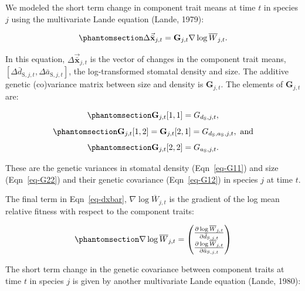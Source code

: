 \documentclass[
  letterpaper,
  DIV=11,
  numbers=noendperiod]{scrartcl}
\begin{document}
We modeled the short term change in component trait means at time \(t\)
in species \(j\) using the multivariate Lande equation (Lande, 1979):

\begin{equation}\phantomsection\label{eq-dxbar}{\Delta \vec{\bar{\mathbf{x}}}_{j,t} = \mathbf{G}_{j,t} \nabla \log \overline{W}_{j,t}.}\end{equation}

In this equation, \(\Delta \vec{\bar{\mathbf{x}}}_{j,t}\) is the vector
of changes in the component trait means,
\(\left[\Delta \bar{d}_{\mathrm{S},j,t}, \Delta \bar{a}_{\mathrm{S},j,t}\right]\),
the log-transformed stomatal density and size. The additive genetic
(co)variance matrix between size and density is \(\mathbf{G}_{j,t}\).
The elements of \(\mathbf{G}_{j,t}\) are:

\begin{equation}\phantomsection\label{eq-G11}{\mathbf{G}_{j,t}[1,1] = G_{d_\mathrm{S},j,t},}\end{equation}
\begin{equation}\phantomsection\label{eq-G12}{\mathbf{G}_{j,t}[1,2] = \mathbf{G}_{j,t}[2,1] = G_{d_\mathrm{S},a_\mathrm{S},j,t},~\text{and}}\end{equation}
\begin{equation}\phantomsection\label{eq-G22}{\mathbf{G}_{j,t}[2,2] = G_{a_\mathrm{S},j,t}.}\end{equation}

These are the genetic variances in stomatal density (Eqn~\ref{eq-G11})
and size (Eqn~\ref{eq-G22}) and their genetic covariance
(Eqn~\ref{eq-G12}) in species \(j\) at time \(t\).

The final term in Eqn~\ref{eq-dxbar}, \(\nabla \log \overline{W}_{j,t}\)
is the gradient of the log mean relative fitness with respect to the
component traits:

\begin{equation}\phantomsection\label{eq-dellogW}{\nabla \log \overline{W}_{j,t} = \begin{pmatrix} \frac{\partial \log \overline{W}_{j,t}}{\partial \bar{d}_{\mathrm{S},j,t}} \\ \frac{\partial \log \overline{W}_{j,t}}{\partial \bar{a}_{\mathrm{S},j,t}} \end{pmatrix}}\end{equation}

The short term change in the genetic covariance between component traits
at time \(t\) in species \(j\) is given by another multivariate Lande
equation (Lande, 1980):
\end{document}
